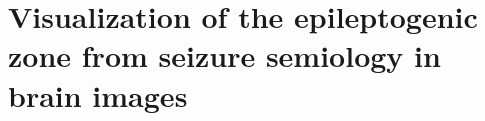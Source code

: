 \chapter[Visualization of the epileptogenic zone in brain images]{Visualization of the epileptogenic zone from seizure semiology in brain images}

\label{chap:svt}
\minitoc


\doublespacing

\onehalfspacing %
